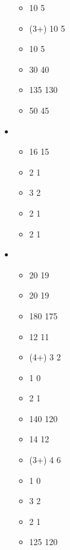 \begin{multicols}{2}
\begin{itemize}
\begin{itemize}
  \item \thane{} \gw{} 10 \costdown{} 5
  \item \thane{} \guildcraftedhandgun{} (3+) 10 \costdown{} 5
  \item \thane{} \ancestralmemory{} 10 \costdown{} 5
  \item \thane{} \battlerune{} 30 \costup{} 40
  \item \runicsmith{} \basecost{} 135 \costdown{} 130
  \item \runicsmith{} \ancestralmemory{} 50 \costdown{} 45
	\end{itemize}
	  \item \core
	\begin{itemize}
  \item \clanmarksmen{} \extramodel{} 16 \costdown{} 15
  \item \clanmarksmen{} \gw{} 2 \costdown{} 1
  \item \clanwarriors{} \spear{} \wordand{} \shield{} 3 \costdown{} 2
  \item \clanwarriors{} \gw{} 2 \costdown{} 1
  \item \greybeards{} \gw{} 2 \costdown{} 1
	\end{itemize}
	  \item \specialTYPE
	\begin{itemize}
  \item \deepwatchSINGULAR{} \extramodel{} 20 \costdown{} 19
  \item \kingsguardSINGULAR{} \extramodel{} 20 \costdown{} 19
  \item \miners{} \basecost{} 180 \costdown{} 175
  \item \miners{} \extramodel{} 12 \costdown{} 11
  \item \miners{} \pistol{} (4+) 3 \costdown{} 2
  \item \miners{} \gw{} 1 \costdown{} 0
  \item \miners{} \pw{} 2 \costdown{} 1
  \item \rangers{} \basecost{} 140 \costdown{} 120
  \item \rangers{} \extramodel{} 14 \costdown{} 12
  \item \rangers{} \crossbow{} (3+) 4 \costup{} 6
  \item \rangers{} \pw{} 1 \costdown{} 0
  \item \rangers{} \gw{} 3 \costdown{} 2
  \item \seekers{} \brothersofvengeance{} 2 \costdown{} 1
  \item \vengeanceseeker{} \basecost{} 125 \costdown{} 120

\end{itemize}
\end{itemize}
\end{multicols}
